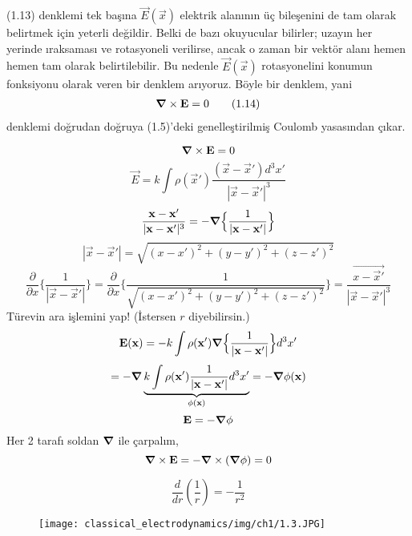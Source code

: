 (1.13) denklemi tek başına $\Vec{E}(\Vec{x})$ elektrik alanının üç bileşenini de tam olarak belirtmek için yeterli değildir. Belki de bazı okuyucular bilirler; uzayın her yerinde ıraksaması ve rotasyoneli verilirse, ancak o zaman bir vektör alanı hemen hemen tam olarak belirtilebilir. Bu nedenle $\Vec{E}(\Vec{x})$ rotasyonelini konumun fonksiyonu olarak veren bir denklem arıyoruz. Böyle bir denklem, yani
\begin{align*}
    \grad \times \Vec{E} = 0 \tag{1.14}
\end{align*}
denklemi doğrudan doğruya (1.5)'deki genelleştirilmiş Coulomb yasasından çıkar.
\begin{theorem}
\[   \grad \times \Vec{E} = 0 \]
\[ \Vec{E} = k \int \rho (\Vec{x}') \dfrac{(\Vec{x} - \Vec{x}') d^{3}x'}{|\Vec{x} - \Vec{x}'|^{3}}  \]
\[ \dfrac{\Vec{x - \Vec{x}'}}{|\Vec{x} - \Vec{x}'|^{3}} = - \grad \Big\{  \dfrac{1}{|\Vec{x} - \Vec{x}'|}  \Big\} \]
\[ |\Vec{x} - \Vec{x}'| = \sqrt{(x-x')^{2} + (y-y')^{2}  + (z-z')^{2} } \]
\[ \dfrac{\partial}{\partial x} \Big\{ \dfrac{1}{|\Vec{x}-\Vec{x}'|} \Big\} = \dfrac{\partial}{\partial x} \Big\{ \dfrac{1}{ \sqrt{(x-x')^{2} + (y-y')^{2}  + (z-z')^{2} }} \Big\} = \dfrac{\Vec{x - \Vec{x}'}}{|\Vec{x} - \Vec{x}'|^{3}} \]
Türevin ara işlemini yap! (İstersen $r$ diyebilirsin.)
\[ \Vec{E} (\Vec{x}) = -k \int \rho (\Vec{x}') \grad  \Big\{ \dfrac{1}{|\Vec{x}-\Vec{x}'|} \Big\} d^{3} x' \]
\[ = -\grad \underbrace{ k \int \rho (\Vec{x}') \dfrac{1}{|\Vec{x}-\Vec{x}'|} d^{3} x'}_{\phi (\Vec{x})} = - \grad \phi (\vec{x})\]
\[ \Vec{E} = -\grad \phi \]
Her 2 tarafı soldan $\grad$ ile çarpalım,
\[ \grad \times \Vec{E} = - \grad \times (\grad \phi) = 0 \] 
\end{theorem}
\begin{note}
\[ \dfrac{d}{dr} (\dfrac{1}{r}) = - \dfrac{1}{r^{2}}\]
\end{note}  

\newpage 

\begin{figure}[h!]
\centering
\texttt{[image: classical\_electrodynamics/img/ch1/1.3.JPG]}
\caption{}
\end{figure} 

